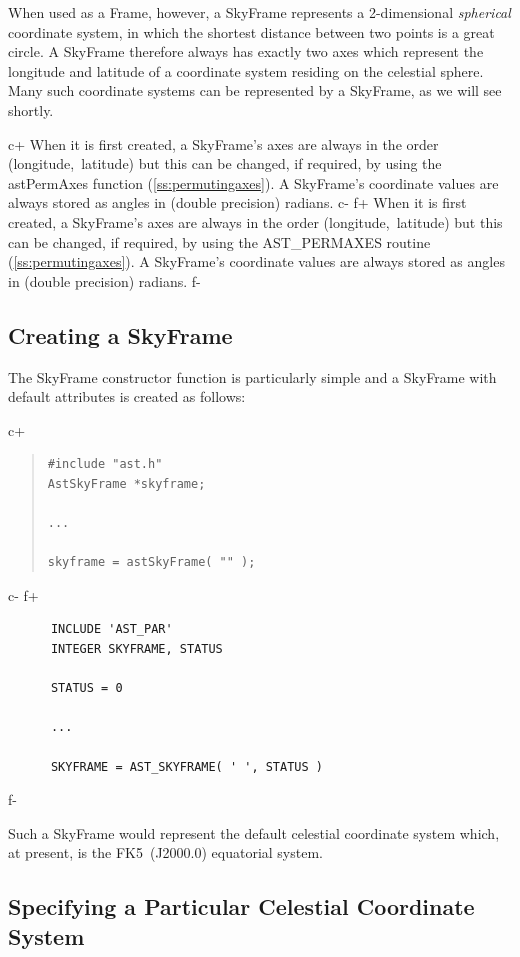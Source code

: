 \documentclass[twoside,11pt]{article}
\newcommand{\secref}[1]{\S\ref{#1}}
\renewcommand{\secref}[1]{\ref{#1}}
\begin{document}
When used as a Frame, however, a SkyFrame represents a 2-dimensional
{\em{spherical}} coordinate system, in which the shortest distance
between two points is a great circle.  A SkyFrame therefore always has
exactly two axes which represent the longitude and latitude of a
coordinate system residing on the celestial sphere. Many such
coordinate systems can be represented by a SkyFrame, as we will see
shortly.

c+
When it is first created, a SkyFrame's axes are always in the order
(longitude,~latitude) but this can be changed, if required, by using
the astPermAxes function (\secref{ss:permutingaxes}). A SkyFrame's
coordinate values are always stored as angles in (double precision)
radians.
c-
f+
When it is first created, a SkyFrame's axes are always in the order
(longitude,~latitude) but this can be changed, if required, by using
the AST\_PERMAXES routine (\secref{ss:permutingaxes}). A SkyFrame's
coordinate values are always stored as angles in (double precision)
radians.
f-

\subsection{Creating a SkyFrame}

The SkyFrame constructor function is particularly simple and a
SkyFrame with default attributes is created as follows:

c+
\begin{quote}
\small
\begin{verbatim}
#include "ast.h"
AstSkyFrame *skyframe;

...

skyframe = astSkyFrame( "" );
\end{verbatim}
\normalsize
\end{quote}
c-
f+
\small
\begin{verbatim}
      INCLUDE 'AST_PAR'
      INTEGER SKYFRAME, STATUS

      STATUS = 0

      ...

      SKYFRAME = AST_SKYFRAME( ' ', STATUS )
\end{verbatim}
\normalsize
f-

Such a SkyFrame would represent the default celestial coordinate
system which, at present, is the FK5~(J2000.0) equatorial system.

\subsection{Specifying a Particular Celestial Coordinate System}
\end{document}
